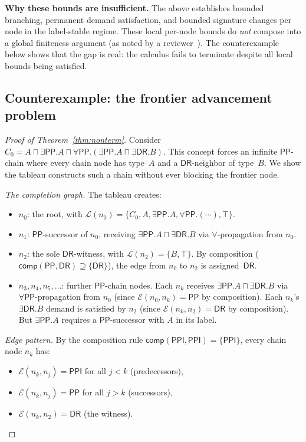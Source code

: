 \documentclass[a4paper,11pt]{article}
\theoremstyle{definition}
\newcommand{\DR}{\ensuremath{\mathsf{DR}}}
\newcommand{\PP}{\ensuremath{\mathsf{PP}}}
\newcommand{\PPI}{\ensuremath{\mathsf{PPI}}}
\newcommand{\comp}{\ensuremath{\mathsf{comp}}}
\newcommand{\LL}{\ensuremath{\mathcal{L}}}
\newcommand{\EE}{\ensuremath{\mathcal{E}}}
\begin{document}
\medskip\noindent\textbf{Why these bounds are insufficient.}\;
The above establishes bounded branching, permanent demand
satisfaction, and bounded signature changes per node in the
label-stable regime.  These local per-node bounds do
\emph{not} compose into a global finiteness argument
(as noted by a reviewer~\cite{GPTReview2}).  The
counterexample below shows that the gap is real: the calculus
fails to terminate despite all local bounds being satisfied.

\subsection{Counterexample: the frontier advancement
  problem}\label{sec:counterexample}

\begin{proof}[Proof of Theorem~\ref{thm:nonterm}]
Consider
$C_0 = A \sqcap \exists\PP.A \sqcap
\forall\PP.(\exists\PP.A \sqcap \exists\DR.B)$.
This concept forces an infinite $\PP$-chain where every
chain node has type~$A$ and a $\DR$-neighbor of type~$B$.
We show the tableau constructs such a chain without ever
blocking the frontier node.

\emph{The completion graph.}
The tableau creates:
\begin{itemize}[nosep]
  \item $n_0$: the root, with $\LL(n_0) = \{C_0,
    A, \exists\PP.A, \forall\PP.(\cdots), \top\}$.
  \item $n_1$: $\PP$-successor of $n_0$, receiving
    $\exists\PP.A \sqcap \exists\DR.B$ via $\forall$-propagation
    from $n_0$.
  \item $n_2$: the sole $\DR$-witness, with $\LL(n_2) = \{B, \top\}$.
    By composition ($\comp(\PP, \DR) \supseteq \{\DR\}$), the
    edge from $n_0$ to $n_2$ is assigned~$\DR$.
  \item $n_3, n_4, n_5, \ldots$: further $\PP$-chain nodes.
    Each $n_k$ receives $\exists\PP.A \sqcap \exists\DR.B$
    via $\forall\PP$-propagation from $n_0$ (since
    $\EE(n_0, n_k) = \PP$ by composition).  Each $n_k$'s
    $\exists\DR.B$ demand is satisfied by $n_2$
    (since $\EE(n_k, n_2) = \DR$ by composition).
    But $\exists\PP.A$ requires a $\PP$-successor with
    $A$ in its label.
\end{itemize}

\emph{Edge pattern.}
By the composition rule $\comp(\PPI, \PPI) = \{\PPI\}$,
every chain node $n_k$ has:
\begin{itemize}[nosep]
  \item $\EE(n_k, n_j) = \PPI$ for all $j < k$ (predecessors),
  \item $\EE(n_k, n_j) = \PP$ for all $j > k$ (successors),
  \item $\EE(n_k, n_2) = \DR$ (the witness).
\end{itemize}


\end{proof}
\end{document}
